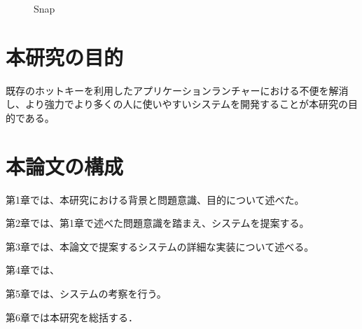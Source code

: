 \begin{figure}[h]
    \begin{center}
    \end{center}
    \caption{Snap}
    \label{fig:snap}
\end{figure}

\section{本研究の目的}

既存のホットキーを利用したアプリケーションランチャーにおける不便を解消し、より強力でより多くの人に使いやすいシステムを開発することが本研究の目的である。

\section{本論文の構成}

第1章では、本研究における背景と問題意識、目的について述べた。

第2章では、第1章で述べた問題意識を踏まえ、システムを提案する。

第3章では、本論文で提案するシステムの詳細な実装について述べる。

第4章では、

第5章では、システムの考察を行う。

第6章では本研究を総括する．